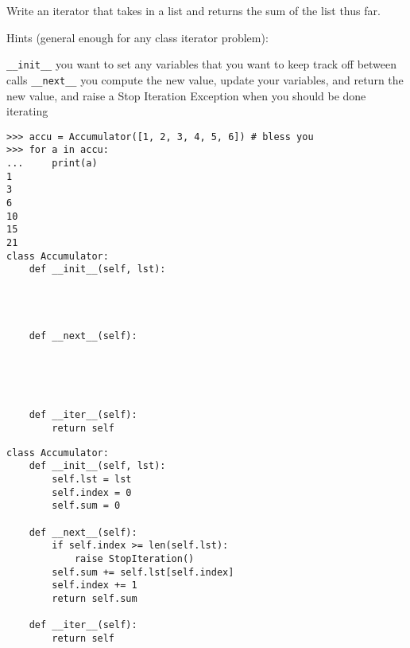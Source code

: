 \begin{blocksection}
\question Write an iterator that takes in a list and returns the sum of the list thus far.

Hints (general enough for any class iterator problem): 

\texttt{\_\_init\_\_} you want to set any variables that you want to keep track off between calls
\texttt{\_\_next\_\_} you compute the new value, update your variables, and return the new value, and raise a Stop Iteration Exception when you should be done iterating

\begin{lstlisting}
>>> accu = Accumulator([1, 2, 3, 4, 5, 6]) # bless you
>>> for a in accu:
...     print(a)
1
3
6
10
15
21
class Accumulator:
    def __init__(self, lst):




    def __next__(self):





    def __iter__(self):
    	return self
\end{lstlisting}
\end{blocksection}
\begin{blocksection}
\begin{solution}[1.5in]
\begin{lstlisting}
class Accumulator:
    def __init__(self, lst):
        self.lst = lst
        self.index = 0
        self.sum = 0

    def __next__(self):
        if self.index >= len(self.lst):
            raise StopIteration()
        self.sum += self.lst[self.index]
        self.index += 1
        return self.sum

    def __iter__(self):
        return self
\end{lstlisting}
\end{solution}
\end{blocksection}

